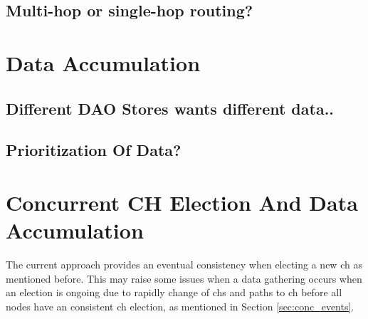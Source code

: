 \documentclass[USenglish]{uit-thesis}
\begin{document}

\subsection{Multi-hop or single-hop routing?}

\section{Data Accumulation}




\subsection{Different DAO Stores wants different data..}
\subsection{Prioritization Of Data?}

\section{Concurrent CH Election And Data Accumulation} \label{disc:simult_el_acc}
The current approach provides an eventual consistency when electing a new \gls{ch} as mentioned before. This may raise some issues when a data gathering occurs when an election is ongoing due to rapidly change of \gls{ch}s and paths to \gls{ch} before all nodes have an consistent \gls{ch} election, as mentioned in Section \ref{sec:conc_events}.
\end{document}
